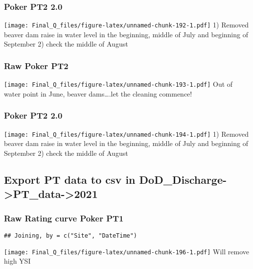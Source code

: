\documentclass[
]{article}
\begin{document}
\hypertarget{poker-pt2-2.0-1}{%
\subsubsection{Poker PT2 2.0}\label{poker-pt2-2.0-1}}

\texttt{[image: Final\_Q\_files/figure-latex/unnamed-chunk-192-1.pdf]} 1)
Removed beaver dam raise in water level in the beginning, middle of July
and beginning of September 2) check the middle of August

\hypertarget{raw-poker-pt2-2}{%
\subsubsection{Raw Poker PT2}\label{raw-poker-pt2-2}}

\texttt{[image: Final\_Q\_files/figure-latex/unnamed-chunk-193-1.pdf]} Out
of water point in June, beaver dams\ldots.let the cleaning commence!

\hypertarget{poker-pt2-2.0-2}{%
\subsubsection{Poker PT2 2.0}\label{poker-pt2-2.0-2}}

\texttt{[image: Final\_Q\_files/figure-latex/unnamed-chunk-194-1.pdf]} 1)
Removed beaver dam raise in water level in the beginning, middle of July
and beginning of September 2) check the middle of August

\hypertarget{export-pt-data-to-csv-in-dod_discharge-pt_data-2021-2}{%
\subsection{Export PT data to csv in
DoD\_Discharge-\textgreater PT\_data-\textgreater2021}\label{export-pt-data-to-csv-in-dod_discharge-pt_data-2021-2}}

\hypertarget{raw-rating-curve-poker-pt1}{%
\subsubsection{Raw Rating curve Poker
PT1}\label{raw-rating-curve-poker-pt1}}

\begin{verbatim}
## Joining, by = c("Site", "DateTime")
\end{verbatim}

\texttt{[image: Final\_Q\_files/figure-latex/unnamed-chunk-196-1.pdf]}
Will remove high YSI
\end{document}
